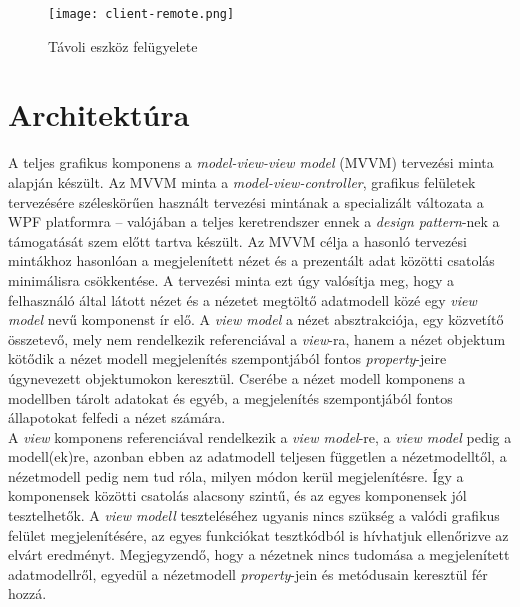 \begin{figure}[h]
\vspace{.5cm}
\texttt{[image: client-remote.png]}
\centering
\vspace{.2cm}
\caption{Távoli eszköz felügyelete}
\vspace{.5cm}
\label{fig:client-remote}
\end{figure}



\section{Architektúra}

A teljes grafikus komponens a \emph{model-view-view model} (MVVM) tervezési minta alapján készült. Az MVVM minta a \emph{model-view-controller}, grafikus felületek tervezésére széleskörűen használt tervezési mintának a specializált változata a WPF platformra -- valójában a teljes keretrendszer ennek a \emph{design pattern}-nek a támogatását szem előtt tartva készült. Az MVVM célja a hasonló tervezési mintákhoz hasonlóan a megjelenített nézet és a prezentált adat közötti csatolás minimálisra csökkentése. A tervezési minta ezt úgy valósítja meg, hogy a felhasználó által látott nézet és a nézetet megtöltő adatmodell közé egy \emph{view model} nevű  komponenst ír elő. A \emph{view model} a nézet absztrakciója, egy közvetítő összetevő, mely nem rendelkezik referenciával a \emph{view}-ra, hanem a nézet objektum kötődik a nézet modell megjelenítés szempontjából fontos \emph{property}-jeire úgynevezett  objektumokon keresztül. Cserébe a nézet modell komponens a modellben tárolt adatokat és egyéb, a megjelenítés szempontjából fontos állapotokat felfedi a nézet számára.\\
A \emph{view} komponens referenciával rendelkezik a \emph{view model}-re, a \emph{view model} pedig a modell(ek)re, azonban ebben az adatmodell teljesen független a nézetmodelltől, a nézetmodell pedig nem tud róla, milyen módon kerül megjelenítésre. Így a komponensek közötti csatolás alacsony szintű, és az egyes komponensek jól tesztelhetők. A \emph{view modell} teszteléséhez ugyanis nincs szükség a valódi grafikus felület megjelenítésére, az egyes funkciókat tesztkódból is hívhatjuk ellenőrizve az elvárt eredményt. Megjegyzendő, hogy a nézetnek nincs tudomása a megjelenített adatmodellről, egyedül a nézetmodell \emph{property}-jein és metódusain keresztül fér hozzá. \cite{wpf-mvvm-pattern}\\
